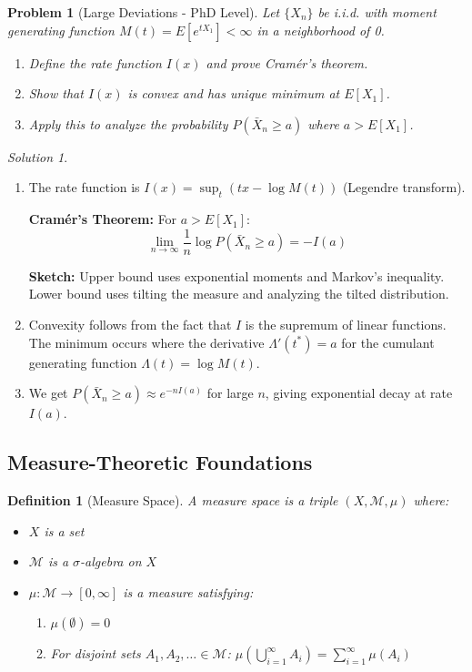 \documentclass[12pt,a4paper]{article}
\newtheorem{definition}{Definition}[section]
\newtheorem{problem}{Problem}[section]
\theoremstyle{remark}
\newtheorem{solution}{Solution}[section]
\begin{document}
\begin{problem}[Large Deviations - PhD Level]
Let $\{X_n\}$ be i.i.d. with moment generating function $M(t) = E[e^{tX_1}] < \infty$ in a neighborhood of 0.
\begin{enumerate}[label=(\alph*)]
\item Define the rate function $I(x)$ and prove Cramér's theorem.
\item Show that $I(x)$ is convex and has unique minimum at $E[X_1]$.
\item Apply this to analyze the probability $P(\bar{X}_n \geq a)$ where $a > E[X_1]$.
\end{enumerate}
\end{problem}

\begin{solution}
\begin{enumerate}[label=(\alph*)]
\item The rate function is $I(x) = \sup_t (tx - \log M(t))$ (Legendre transform). 

\textbf{Cramér's Theorem:} For $a > E[X_1]$:
$$\lim_{n \to \infty} \frac{1}{n} \log P(\bar{X}_n \geq a) = -I(a)$$

\textbf{Sketch:} Upper bound uses exponential moments and Markov's inequality. Lower bound uses tilting the measure and analyzing the tilted distribution.

\item Convexity follows from the fact that $I$ is the supremum of linear functions. The minimum occurs where the derivative $\Lambda'(t^*) = a$ for the cumulant generating function $\Lambda(t) = \log M(t)$.

\item We get $P(\bar{X}_n \geq a) \approx e^{-nI(a)}$ for large $n$, giving exponential decay at rate $I(a)$.
\end{enumerate}
\end{solution}

\subsection{Measure-Theoretic Foundations}

\begin{definition}[Measure Space]
A measure space is a triple $(X, \mathcal{M}, \mu)$ where:
\begin{itemize}
\item $X$ is a set
\item $\mathcal{M}$ is a $\sigma$-algebra on $X$
\item $\mu: \mathcal{M} \to [0, \infty]$ is a measure satisfying:
  \begin{enumerate}
  \item $\mu(\emptyset) = 0$
  \item For disjoint sets $A_1, A_2, \ldots \in \mathcal{M}$: $\mu\left(\bigcup_{i=1}^{\infty} A_i\right) = \sum_{i=1}^{\infty} \mu(A_i)$
  \end{enumerate}
\end{itemize}
\end{definition}
\end{document}
